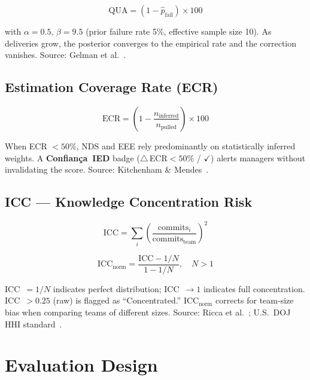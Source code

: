 \documentclass[conference]{IEEEtran}
\begin{document}
\begin{equation}
  \text{QUA} = (1 - \hat{p}_\text{fail}) \times 100
  \label{eq:qua}
\end{equation}

with $\alpha = 0.5$, $\beta = 9.5$ (prior failure rate 5\%, effective sample
size 10). As deliveries grow, the posterior converges to the empirical rate and
the correction vanishes. Source: Gelman et al.~\cite{gelman2013}.

\subsection{Estimation Coverage Rate (ECR)}

\begin{equation}
  \text{ECR} = \left(1 - \frac{n_\text{inferred}}{n_\text{pulled}}\right) \times 100
\end{equation}

When ECR $< 50\%$, NDS and EEE rely predominantly on statistically inferred
weights. A \textbf{Confiança~IED} badge ($\triangle\,$ECR${<}50\%$ / $\checkmark$)
alerts managers without invalidating the score.
Source: Kitchenham \& Mendes~\cite{kitchenham2004}.

\subsection{ICC --- Knowledge Concentration Risk}

\begin{equation}
  \text{ICC} = \sum_i \left(\frac{\text{commits}_i}{\text{commits}_\text{team}}\right)^2
\end{equation}

\begin{equation}
  \text{ICC}_\text{norm} = \frac{\text{ICC} - 1/N}{1 - 1/N}, \quad N > 1
\end{equation}

ICC~$=1/N$ indicates perfect distribution; ICC~$\to 1$ indicates full
concentration. ICC~$> 0.25$ (raw) is flagged as ``Concentrated.''
$\text{ICC}_\text{norm}$ corrects for team-size bias when comparing teams of
different sizes.
Source: Ricca et al.~\cite{ricca2019}; U.S.~DOJ HHI standard~\cite{doj2010}.

\section{Evaluation Design}
\label{sec:evaluation}
\end{document}
